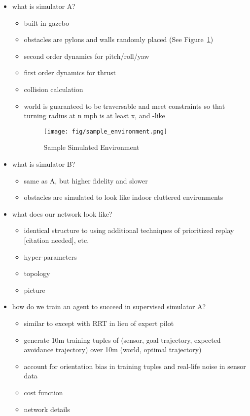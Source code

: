 \documentclass[paper=a4, fontsize=11pt]{scrartcl} %
\begin{document}
\begin{itemize}
	\item what is simulator A?
	\begin{itemize}
		\item built in gazebo
		\item obstacles are pylons and walls randomly placed (See Figure~\ref{fig:sample_environment})
		\item second order dynamics for pitch/roll/yaw
		\item first order dynamics for thrust
		\item collision calculation
		\item world is guaranteed to be traversable and meet constraints so that turning radius at n mph is at least x, and \cite{Richter2014}-like 
		\begin{figure}
		  \centering
		  \texttt{[image: fig/sample\_environment.png]}
		  \caption{Sample Simulated Environment}
		  \label{fig:sample_environment}
		\end{figure}
	\end{itemize}

	\item what is simulator B?
	\begin{itemize}
		\item same as A, but higher fidelity and slower
		\item obstacles are simulated to look like indoor cluttered environments
	\end{itemize}

	\item what does our network look like?
	\begin{itemize}
		\item identical structure to \cite{Lillicrap2015} using additional techniques of prioritized replay [citation needed], etc.
		\item hyper-parameters
		\item topology
		\item picture
	\end{itemize}

	\item how do we train an agent to succeed in supervised simulator A?
	\begin{itemize}
		\item similar to \cite{Kim2015} except with RRT in lieu of expert pilot 
		\item generate 10m training tuples of (sensor, goal trajectory, expected avoidance trajectory) over 10m (world, optimal trajectory)
		\item account for orientation bias in training tuples and real-life noise in sensor data
		\item cost function
		\item network details
	\end{itemize}


\end{itemize}
\end{document}
